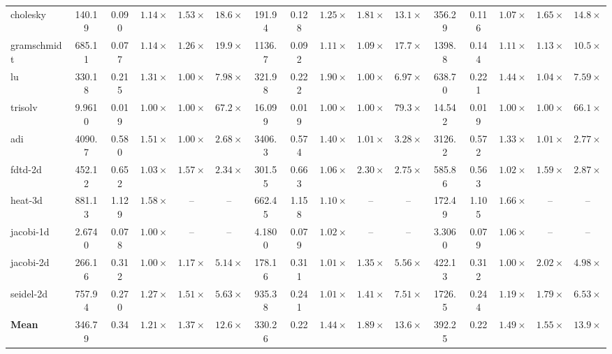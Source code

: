 \begin{table}[tbp]
{\begin{tabular}{lccccccccccccccc}
cholesky & 140.19 & 0.090 & \(1.14\times\) & \(1.53\times\) & \(18.6\times\) & 191.94 & 0.128 & \(1.25\times\) & \(1.81\times\) & \(13.1\times\) & 356.29 & 0.116 & \(1.07\times\) & \(1.65\times\) & \(14.8\times\) \\
gramschmidt & 685.11 & 0.077 & \(1.14\times\) & \(1.26\times\) & \(19.9\times\) & 1136.7 & 0.092 & \(1.11\times\) & \(1.09\times\) & \(17.7\times\) & 1398.8 & 0.144 & \(1.11\times\) & \(1.13\times\) & \(10.5\times\) \\
lu & 330.18 & 0.215 & \(1.31\times\) & \(1.00\times\) & \(7.98\times\) & 321.98 & 0.222 & \(1.90\times\) & \(1.00\times\) & \(6.97\times\) & 638.70 & 0.221 & \(1.44\times\) & \(1.04\times\) & \(7.59\times\) \\
trisolv & 9.9610 & 0.019 & \(1.00\times\) & \(1.00\times\) & \(67.2\times\) & 16.099 & 0.019 & \(1.00\times\) & \(1.00\times\) & \(79.3\times\) & 14.542 & 0.019 & \(1.00\times\) & \(1.00\times\) & \(66.1\times\) \\
adi & 4090.7 & 0.580 & \(1.51\times\) & \(1.00\times\) & \(2.68\times\) & 3406.3 & 0.574 & \(1.40\times\) & \(1.01\times\) & \(3.28\times\) & 3126.2 & 0.572 & \(1.33\times\) & \(1.01\times\) & \(2.77\times\) \\
fdtd-2d & 452.12 & 0.652 & \(1.03\times\) & \(1.57\times\) & \(2.34\times\) & 301.55 & 0.663 & \(1.06\times\) & \(2.30\times\) & \(2.75\times\) & 585.86 & 0.563 & \(1.02\times\) & \(1.59\times\) & \(2.87\times\) \\
heat-3d & 881.13 & 1.129 & \(1.58\times\) & -- & -- & 662.45 & 1.158 & \(1.10\times\) & -- & -- & 172.49 & 1.105 & \(1.66\times\) & -- & -- \\
jacobi-1d & 2.6740 & 0.078 & \(1.00\times\) & -- & -- & 4.1800 & 0.079 & \(1.02\times\) & -- & -- & 3.3060 & 0.079 & \(1.06\times\) & -- & -- \\
jacobi-2d & 266.16 & 0.312 & \(1.00\times\) & \(1.17\times\) & \(5.14\times\) & 178.16 & 0.311 & \(1.01\times\) & \(1.35\times\) & \(5.56\times\) & 422.13 & 0.312 & \(1.00\times\) & \(2.02\times\) & \(4.98\times\) \\
seidel-2d & 757.94 & 0.270 & \(1.27\times\) & \(1.51\times\) & \(5.63\times\) & 935.38 & 0.241 & \(1.01\times\) & \(1.41\times\) & \(7.51\times\) & 1726.5 & 0.244 & \(1.19\times\) & \(1.79\times\) & \(6.53\times\) \\
\midrule
\textbf{Mean} & 346.79 & 0.34 & \(\mathbf{1.21\times}\) & \(\mathbf{1.37\times}\) & \(\mathbf{12.6\times}\) & 330.26 & 0.22 & \(\mathbf{1.44\times}\) & \(\mathbf{1.89\times}\) & \(\mathbf{13.6\times}\) & 392.25 & 0.22 & \(\mathbf{1.49\times}\) & \(\mathbf{1.55\times}\) & \(\mathbf{13.9\times}\) \\
\bottomrule
\end{tabular}
}
\vspace{-0.5\baselineskip}
\end{table}

